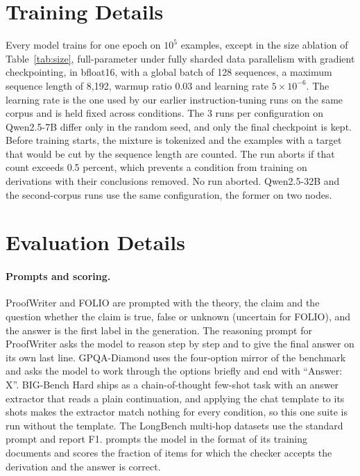 \section{Training Details}
\label{sec:sweep-details}

Every model trains for one epoch on $10^5$ examples, except in the size
ablation of Table~\ref{tab:size}, full-parameter under
fully sharded data parallelism with gradient checkpointing, in bfloat16,
with a global batch of 128 sequences, a maximum sequence length of 8{,}192,
warmup ratio 0.03 and learning rate $5\times10^{-6}$. The learning rate is
the one used by our earlier instruction-tuning runs on the same corpus and
is held fixed across conditions. The 3 runs per configuration on Qwen2.5-7B
differ only in the random seed, and only the final checkpoint is kept. Before
training starts, the mixture is tokenized and the examples with a target that
would be cut by the sequence length are counted. The run aborts if that
count exceeds 0.5 percent, which prevents a condition from training on
derivations with their conclusions removed. No run aborted. Qwen2.5-32B
and the second-corpus runs use the same configuration, the former on two
nodes.

\section{Evaluation Details}
\label{sec:metrics}

\paragraph{Prompts and scoring.} ProofWriter and FOLIO are prompted with the
theory, the claim and the question whether the claim is true, false or
unknown (uncertain for FOLIO), and the answer is the first label in the
generation. The reasoning prompt for ProofWriter asks the model to reason
step by step and to give the final answer on its own last line. GPQA-Diamond
uses the four-option mirror of the benchmark and asks the model to work
through the options briefly and end with ``Answer: X''. BIG-Bench Hard ships
as a chain-of-thought few-shot task with an answer extractor that reads a plain
continuation, and applying the chat template to its shots makes the
extractor match nothing for every condition, so this one suite is run without
the template. The LongBench multi-hop datasets use the standard prompt and
report F1. \branchproof{} prompts the model in the format of its training
documents and scores the fraction of items for which the checker accepts
the derivation and the answer is correct.

